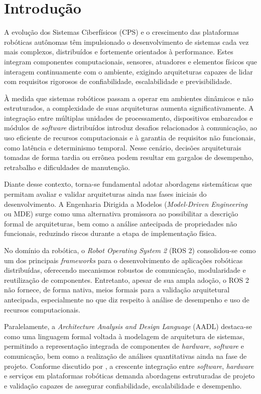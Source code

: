 \chapter{Introdução} 
A evolução dos Sistemas Ciberfísicos (CPS) e o crescimento das plataformas robóticas autônomas têm impulsionado o desenvolvimento de sistemas cada vez mais complexos, distribuídos e fortemente orientados à performance. Estes integram componentes computacionais, sensores, atuadores e elementos físicos que interagem continuamente com o ambiente, exigindo arquiteturas capazes de lidar com requisitos rigorosos de confiabilidade, escalabilidade e previsibilidade. 

À medida que sistemas robóticos passam a operar em ambientes dinâmicos e não estruturados, a complexidade de suas arquiteturas aumenta significativamente. A integração entre múltiplas unidades de processamento, dispositivos embarcados e módulos de \textit{software} distribuídos introduz desafios relacionados à comunicação, ao uso eficiente de recursos computacionais e à garantia de requisitos não funcionais, como latência e determinismo temporal. Nesse cenário, decisões arquiteturais tomadas de forma tardia ou errônea podem resultar em gargalos de desempenho, retrabalho e dificuldades de manutenção. 

Diante desse contexto, torna-se fundamental adotar abordagens sistemáticas que permitam avaliar e validar arquiteturas ainda nas fases iniciais do desenvolvimento. A Engenharia Dirigida a Modelos (\textit{Model-Driven Engineering} ou MDE) surge como uma alternativa promissora ao possibilitar a descrição formal de arquiteturas, bem como a análise antecipada de propriedades não funcionais, reduzindo riscos durante a etapa de implementação física. 

No domínio da robótica, o \textit{Robot Operating System 2} (ROS 2) consolidou-se como um dos principais \textit{frameworks} para o desenvolvimento de aplicações robóticas distribuídas, oferecendo mecanismos robustos de comunicação, modularidade e reutilização de componentes. Entretanto, apesar de sua ampla adoção, o ROS 2 não fornece, de forma nativa, meios formais para a validação arquitetural antecipada, especialmente no que diz respeito à análise de desempenho e uso de recursos computacionais. 

Paralelamente, a \textit{Architecture Analysis and Design Language} (AADL) destaca-se como uma linguagem formal voltada à modelagem de arquitetura de sistemas, permitindo a representação integrada de componentes de \textit{hardware}, \textit{software} e comunicação, bem como a realização de análises quantitativas ainda na fase de projeto. Conforme discutido por \cite{Mikusz2014}, a crescente integração entre \textit{software}, \textit{hardware} e serviços em plataformas robóticas demanda abordagens estruturadas de projeto e validação capazes de assegurar confiabilidade, escalabilidade e desempenho. 

